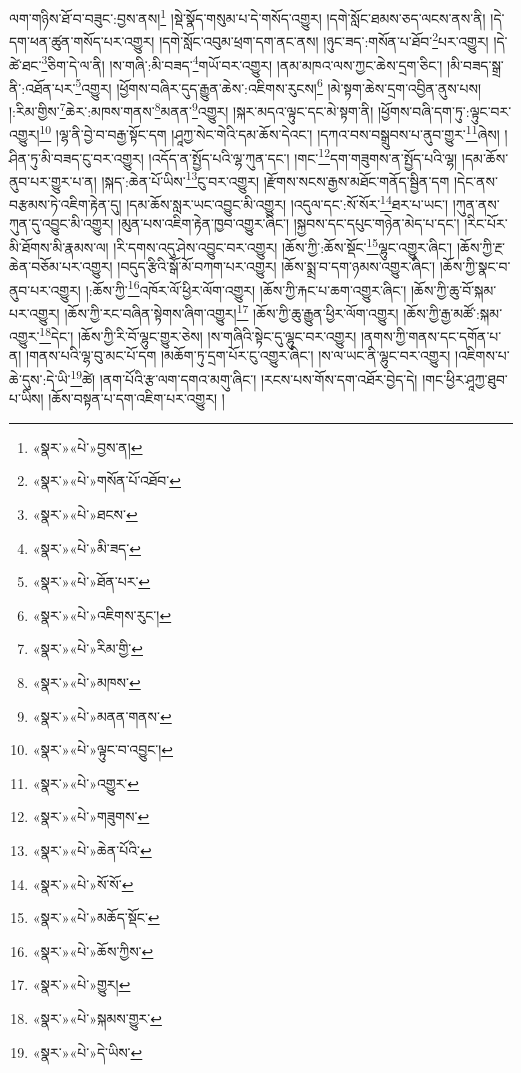 ལག་གཉིས་ཐོ་བ་བཟུང་:བྱས་ནས།\footnote{«སྣར་»«པེ་»བྱས་ན།} །སྡེ་སྣོད་གསུམ་པ་དེ་གསོད་འགྱུར། །དགེ་སློང་ཐམས་ཅད་ལངས་ནས་ནི། །དེ་དག་ཕན་ཚུན་གསོད་པར་འགྱུར། །དགེ་སློང་འབུམ་ཕྲག་དག་ནང་ནས། །ཉུང་ཟད་:གསོན་པ་ཐོབ་\footnote{«སྣར་»«པེ་»གསོན་པོ་འཐོབ་}པར་འགྱུར། །དེ་ཚེ་ཐང་\footnote{«སྣར་»«པེ་»ཐངས་}ཅིག་དེ་ལ་ནི། །ས་གཞི་:མི་བཟད་\footnote{«སྣར་»«པེ་»མི་ཟད་}གཡོ་བར་འགྱུར། །ནམ་མཁའ་ལས་ཀྱང་ཆེས་དྲག་ཅིང་། །མི་བཟད་སྒྲ་ནི་:འཐོན་པར་\footnote{«སྣར་»«པེ་»ཐོན་པར་}འགྱུར། །ཕྱོགས་བཞིར་དུད་རྒྱུན་ཆེས་:འཇིགས་རུངས།\footnote{«སྣར་»«པེ་»འཇིགས་རུང་།} །མེ་སྟག་ཆེས་དྲག་འབྱིན་ནུས་པས། །:རིམ་གྱིས་\footnote{«སྣར་»«པེ་»རིམ་གྱི་}ཆེར་:མཁས་གནས་\footnote{«སྣར་»«པེ་»མཁས་}མནན་\footnote{«སྣར་»«པེ་»མནན་གནས་}འགྱུར། །སྐར་མདའ་ལྟུང་དང་མེ་སྟག་ནི། །ཕྱོགས་བཞི་དག་ཏུ་:ལྟུང་བར་འགྱུར།\footnote{«སྣར་»«པེ་»ལྟུང་བ་འབྱུང་།} །ལྷ་ནི་བྱེ་བ་བརྒྱ་སྟོང་དག །ཤཱཀྱ་སེང་གེའི་དམ་ཆོས་དེའང་། །དཀའ་བས་བསྒྲུབས་པ་ནུབ་གྱུར་\footnote{«སྣར་»«པེ་»འགྱུར་}ཞེས། །ཤིན་ཏུ་མི་བཟད་ངུ་བར་འགྱུར། །འདོད་ན་སྤྱོད་པའི་ལྷ་ཀུན་དང་། །གང་\footnote{«སྣར་»«པེ་»གཟུགས་}དག་གཟུགས་ན་སྤྱོད་པའི་ལྷ། །དམ་ཆོས་ནུབ་པར་གྱུར་པ་ན། །སྐད་:ཆེན་པོ་ཡིས་\footnote{«སྣར་»«པེ་»ཆེན་པོའི་}ངུ་བར་འགྱུར། །རྫོགས་སངས་རྒྱས་མཐོང་གནོད་སྦྱིན་དག །དེང་ནས་བརྩམས་ཏེ་འཇིག་རྟེན་དུ། །དམ་ཆོས་སླར་ཡང་འབྱུང་མི་འགྱུར། །འདུལ་དང་:སོ་སོར་\footnote{«སྣར་»«པེ་»སོ་སོ་}ཐར་པ་ཡང་། །ཀུན་ནས་ཀུན་དུ་འབྱུང་མི་འགྱུར། །མུན་པས་འཇིག་རྟེན་ཁྱབ་འགྱུར་ཞིང་། །སྐྱབས་དང་དཔུང་གཉེན་མེད་པ་དང་། །རིང་པོར་མི་ཐོགས་མི་རྣམས་ལ། །རི་དགས་འདུ་ཤེས་འབྱུང་བར་འགྱུར། །ཆོས་ཀྱི་:ཆོས་སྡོང་\footnote{«སྣར་»«པེ་»མཆོད་སྡོང་}ལྷུང་འགྱུར་ཞིང་། །ཆོས་ཀྱི་རྔ་ཆེན་བཅོམ་པར་འགྱུར། །བདུད་རྩིའི་སྒོ་མོ་བཀག་པར་འགྱུར། །ཆོས་སྨྲ་བ་དག་ཉམས་འགྱུར་ཞིང་། །ཆོས་ཀྱི་སྣང་བ་ནུབ་པར་འགྱུར། །:ཆོས་ཀྱི་\footnote{«སྣར་»«པེ་»ཆོས་ཀྱིས་}འཁོར་ལོ་ཕྱིར་ལོག་འགྱུར། །ཆོས་ཀྱི་རྐང་པ་ཆག་འགྱུར་ཞིང་། །ཆོས་ཀྱི་ཆུ་བོ་སྐམ་པར་འགྱུར། །ཆོས་ཀྱི་རང་བཞིན་སྟེགས་ཞིག་འགྱུར།\footnote{«སྣར་»«པེ་»གྱུར།} །ཆོས་ཀྱི་ཆུ་རྒྱུན་ཕྱིར་ལོག་འགྱུར། །ཆོས་ཀྱི་རྒྱ་མཚོ་:སྐམ་འགྱུར་\footnote{«སྣར་»«པེ་»སྐམས་གྱུར་}དེང་། །ཆོས་ཀྱི་རི་བོ་ལྷུང་གྱུར་ཅེས། །ས་གཞིའི་སྟེང་དུ་ལྷུང་བར་འགྱུར། །ནགས་ཀྱི་གནས་དང་དགོན་པ་ན། །གནས་པའི་ལྷ་བུ་མང་པོ་དག །མཆོག་ཏུ་དྲག་པོར་ངུ་འགྱུར་ཞིང་། །ས་ལ་ཡང་ནི་ལྷུང་བར་འགྱུར། །འཇིགས་པ་ཆེ་དུས་:དེ་ཡི་\footnote{«སྣར་»«པེ་»དེ་ཡིས་}ཚེ། །ནག་པོའི་རྩ་ལག་དགའ་མགུ་ཞིང་། །རངས་པས་གོས་དག་འཐོར་བྱེད་དེ། །གང་ཕྱིར་ཤཱཀྱ་ཐུབ་པ་ཡིས། །ཆོས་བསྟན་པ་དག་འཇིག་པར་འགྱུར། །
